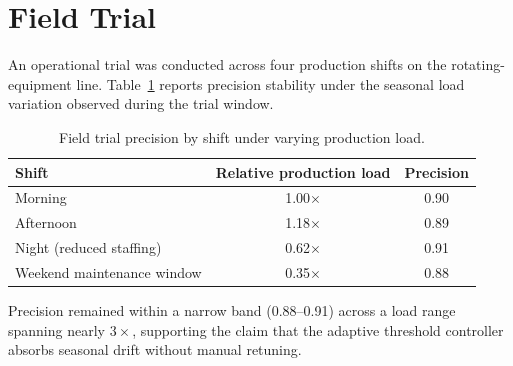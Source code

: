 \section{Field Trial}
An operational trial was conducted across four production shifts on the rotating-equipment
line. Table~\ref{tab:trial} reports precision stability under the seasonal load variation
observed during the trial window.

\begin{table}[htbp]
\centering
\caption{Field trial precision by shift under varying production load.}
\label{tab:trial}
\begin{tabular}{@{}l c c@{}}
\toprule
Shift & Relative production load & Precision \\
\midrule
Morning & 1.00$\times$ & 0.90 \\
Afternoon & 1.18$\times$ & 0.89 \\
Night (reduced staffing) & 0.62$\times$ & 0.91 \\
Weekend maintenance window & 0.35$\times$ & 0.88 \\
\bottomrule
\end{tabular}
\end{table}

Precision remained within a narrow band (0.88--0.91) across a load range spanning nearly
$3\times$, supporting the claim that the adaptive threshold controller absorbs seasonal
drift without manual retuning.
